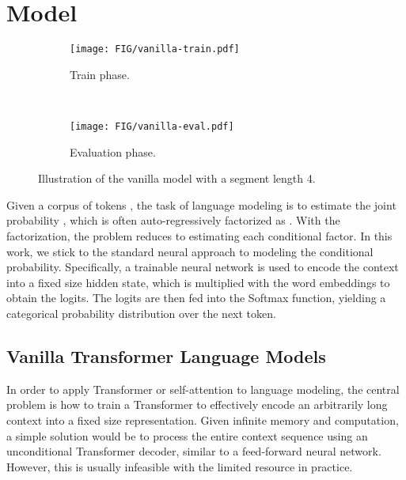 \documentclass[11pt,a4paper]{article}
\newcommand{\rulesep}{\unskip\ \vrule\ }
\begin{document}
 \section{Model} \label{sec:model}
\begin{figure*}[t]
	\begin{subfigure}[b]{0.292\linewidth}
		\texttt{[image: FIG/vanilla-train.pdf]}
		\caption{\small Train phase.}
		\label{fig:vanilla-train}
	\end{subfigure}
	\rulesep
	\begin{subfigure}[b]{0.69\linewidth}
		\texttt{[image: FIG/vanilla-eval.pdf]}
		\caption{\small Evaluation phase.}
		\label{fig:vanilla-eval}
	\end{subfigure}
	\caption{\small Illustration of the vanilla model with a segment length 4.}
	\label{fig:vanilla}
\vspace{-1em}
\end{figure*}

Given a corpus of tokens , the task of language modeling is to estimate the joint probability , which is often auto-regressively factorized as .
With the factorization, the problem reduces to estimating each conditional factor.
In this work, we stick to the standard neural approach to modeling the conditional probability.
Specifically, a trainable neural network is used to encode the context  into a fixed size hidden state, which is multiplied with the word embeddings to obtain the logits.
The logits are then fed into the Softmax function, yielding a categorical probability distribution over the next token.

\subsection{Vanilla Transformer Language Models}
In order to apply Transformer or self-attention to language modeling, the central problem is how to train a Transformer to effectively encode an arbitrarily long context into a fixed size representation.
Given infinite memory and computation, a simple solution would be to process the entire context sequence using an unconditional Transformer decoder, similar to a feed-forward neural network.
However, this is usually infeasible with the limited resource in practice.
\end{document}
